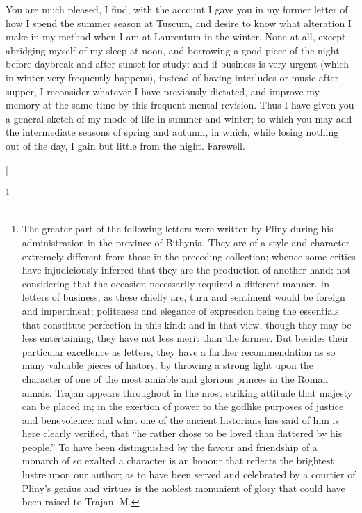 
You are much pleased, I find, with the account I gave you in my former
letter of how I spend the summer season at Tuscum, and desire to know what
alteration I make in my method when I am at Laurentum in the winter. None
at all, except abridging myself of my sleep at noon, and borrowing a good
piece of the night before daybreak and after sunset for study: and if
business is very urgent (which in winter very frequently happens), instead
of having interludes or music after supper, I reconsider whatever I have
previously dictated, and improve my memory at the same time by this
frequent mental revision. Thus I have given you a general sketch of my
mode of life in summer and winter; to which you may add the intermediate
seasons of spring and autumn, in which, while losing nothing out of the
day, I gain but little from the night. Farewell.

]



\footnote{The greater part of
the following letters were written by Pliny during his administration in
the province of Bithynia. They are of a style and character extremely
different from those in the preceding collection; whence some critics have
injudiciously inferred that they are the production of another hand: not
considering that the occasion necessarily required a different manner. In
letters of business, as these chiefly are, turn and sentiment would be
foreign and impertinent; politeness and elegance of expression being the
essentials that constitute perfection in this kind: and in that view,
though they may be less entertaining, they have not less merit than the
former. But besides their particular excellence as letters, they have a
farther recommendation as so many valuable pieces of history, by throwing
a strong light upon the character of one of the most amiable and glorious
princes in the Roman annals. Trajan appears throughout in the most
striking attitude that majesty can be placed in; in the exertion of power
to the godlike purposes of justice and benevolence: and what one of the
ancient historians has said of him is here clearly verified, that ``he
rather chose to be loved than flattered by his people.'' To have been
distinguished by the favour and friendship of a monarch of so exalted a
character is an honour that reflects the brightest lustre upon our author;
as to have been served and celebrated by a courtier of Pliny's genius and
virtues is the noblest monunient of glory that could have been raised to
Trajan. M.}

